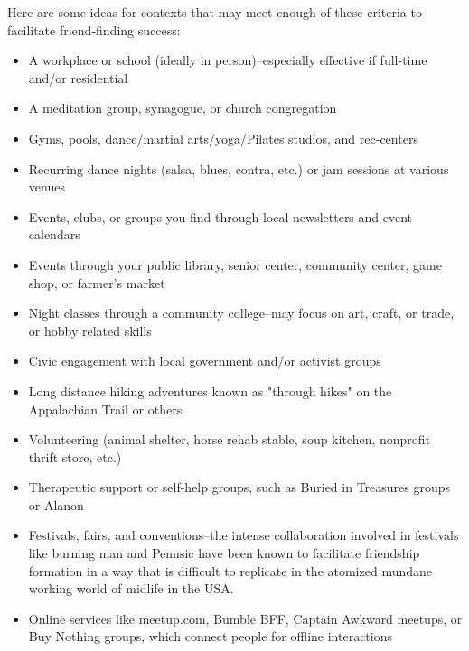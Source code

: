 \documentclass[12pt,letterpaper]{book}
\begin{document}
Here are some ideas for contexts that may meet enough of these criteria to facilitate friend-finding success:
\begin{itemize}
	\item A workplace or school (ideally in person)–especially effective if full-time and/or residential
	\item A meditation group, synagogue, or church congregation
	\item Gyms, pools, dance/martial arts/yoga/Pilates studios, and rec-centers
	\item Recurring dance nights (salsa, blues, contra, etc.) or jam sessions at various venues
	\item Events, clubs, or groups you find through local newsletters and event calendars
	\item Events through your public library, senior center, community center, game shop, or farmer's market
	\item Night classes through a community college–may focus on art, craft, or trade, or hobby related skills
	\item Civic engagement with local government and/or activist groups
	\item Long distance hiking adventures known as "through hikes" on the Appalachian Trail or others
	\item Volunteering (animal shelter, horse rehab stable, soup kitchen, nonprofit thrift store, etc.)
	\item Therapeutic support or self-help groups, such as Buried in Treasures groups or Alanon
	\item Festivals, fairs, and conventions–the intense collaboration involved in festivals like burning man \cite{st2018civilised} and Pennsic have been known to facilitate friendship formation in a way that is difficult to replicate in the atomized mundane working world of midlife in the USA.
	\item Online services like meetup.com, Bumble BFF, Captain Awkward meetups, or Buy Nothing groups, which connect people for offline interactions
\end{itemize}
\end{document}
